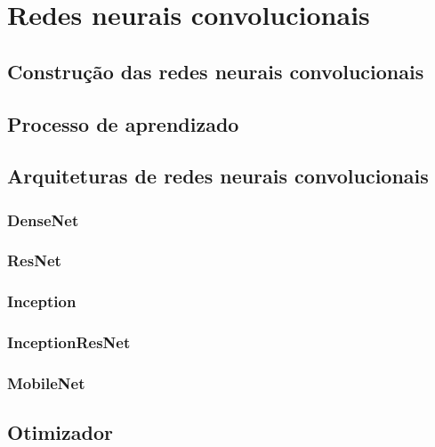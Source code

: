 \section{Redes neurais convolucionais}

\subsection{Construção das redes neurais convolucionais}

\subsection{Processo de aprendizado}

\subsection{Arquiteturas de redes neurais convolucionais}

\subsubsection{DenseNet}

\subsubsection{ResNet}

\subsubsection{Inception}

\subsubsection{InceptionResNet}

\subsubsection{MobileNet}

\subsection{Otimizador}